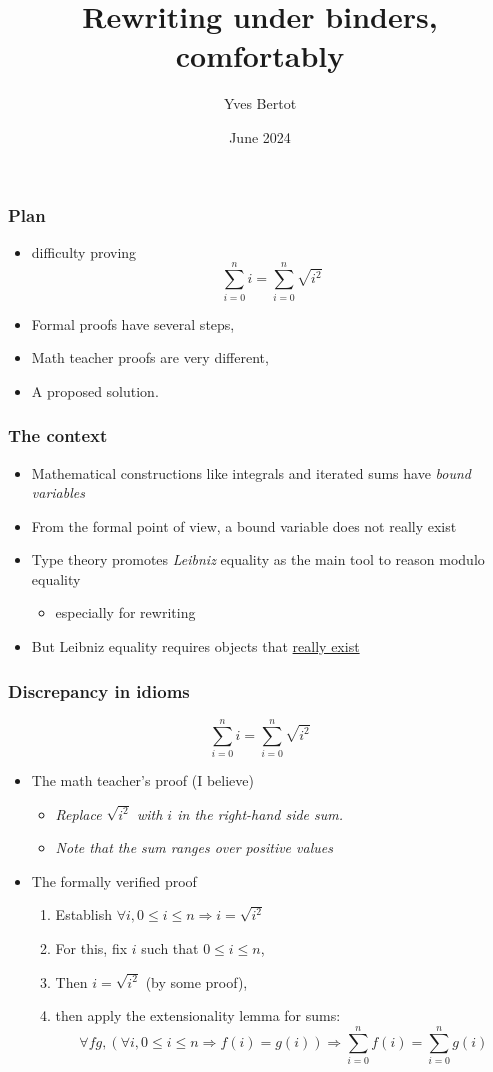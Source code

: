 \documentclass[compress]{beamer}
\title{Rewriting under binders, comfortably}
\author{Yves Bertot}
\date{June 2024}
\begin{document}
\maketitle
\begin{frame}
\frametitle{Plan}
\begin{itemize}
\item difficulty proving \[\sum_{i = 0}^{n} i = \sum_{i = 0}^{n} \sqrt{i^2}\]
\item Formal proofs have several steps, 
\item Math teacher proofs are very different,
\item A proposed solution.
\end{itemize}
\end{frame}
\begin{frame}
\frametitle{The context}
\begin{itemize}
\item Mathematical constructions like integrals and iterated sums have
{\em bound variables}
\item From the formal point of view, a bound variable does not really exist
\item Type theory promotes {\em Leibniz} equality as the main tool
to reason modulo equality
\begin{itemize}
\item especially for rewriting
\end{itemize}
\item But Leibniz equality requires objects that \underline{really exist}
\end{itemize}
\end{frame}
\begin{frame}
\frametitle{Discrepancy in idioms}
\[\sum_{i = 0}^{n} i = \sum_{i = 0}^{n} \sqrt{i ^ 2}\]
\begin{itemize}
\item The math teacher's proof (I believe)
\begin{itemize}
\item {\em Replace \(\sqrt{i^2}\) with \(i\) in the right-hand side sum.}
\item {\em Note that the sum ranges over positive values}
\end{itemize}
\item The formally verified proof
\begin{enumerate}
\item Establish \(\forall i, 0 \leq i \leq n \Rightarrow i = \sqrt{i ^ 2}\)
\item For this, fix \(i\) such that \(0 \leq i \leq n\),
\item Then \(i = \sqrt{i ^ 2}\) (by some proof),
\item then apply the extensionality lemma for sums:
\[\forall f g, (\forall i, 0 \leq i \leq n \Rightarrow f(i) = g(i)) \Rightarrow
\sum_{i = 0}^{n} f(i) = \sum_{i = 0}^{n} g(i)\]
\end{enumerate}
\end{itemize}
\end{frame}
\end{document}
